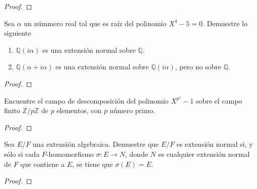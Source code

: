 \documentclass[12pt]{report}
\theoremstyle{largebreak}
\begin{document}
\begin{proof}
    
\end{proof}

\begin{excer}
    Sea $\alpha$ un númmero real tal que es raíz del polinomio $X^4-5=0$. Demuestre lo siguiente
    \begin{enumerate}
        \item $\mathbb{Q}(i\alpha)$ es una extensión normal sobre $\mathbb{Q}$.
        \item $\mathbb{Q}(\alpha+i\alpha)$ es una extensión normal sobre $\mathbb{Q}(i\alpha)$, pero no sobre $\mathbb{Q}$.
    \end{enumerate}
\end{excer}

\begin{proof}
    
\end{proof}

\begin{excer}
    Encuentre el campo de descomposición del polinomio $X^{p^s}-1$ sobre el campo finito $\mathbb{Z}/p\mathbb{Z}$ de $p$ elementos, con $p$ número primo.
\end{excer}

\begin{proof}
    
\end{proof}

\begin{excer}
    Sea $E/F$ una extensión algebraica. Demuestre que $E/F$ es extensión normal si, y sólo si cada $F$-homomorfismo $\sigma:E\rightarrow N$, donde $N$ es cualquier extensión normal de $F$ que contiene a $E$, se tiene que $\sigma(E)=E$.
\end{excer}

\begin{proof}
    
\end{proof}
\end{document}
